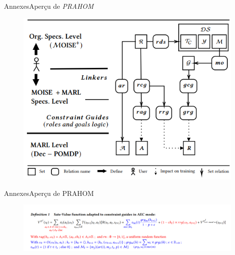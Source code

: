 \begin{frame}{Annexes}{Aperçu de \textit{PRAHOM}}
    \begin{figure}
        \includegraphics[width=0.6\linewidth]{figures/mm_simple_representation.png}
    \end{figure}
\end{frame}
    
\begin{frame}{Annexes}{Aperçu de PRAHOM}
    \begin{figure}
        \includegraphics[width=\linewidth]{figures/modified_state_value_function.png}
    \end{figure}
\end{frame}
    
